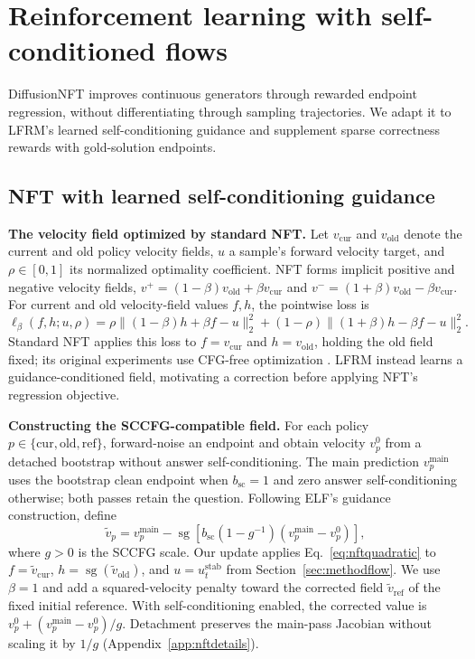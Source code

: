 \documentclass{article}
\newcommand{\sg}{\operatorname{sg}}
\newcommand{\rev}[1]{{\color{blue}#1}}
\begin{document}

\section{Reinforcement learning with self-conditioned flows}
\label{sec:nft}

DiffusionNFT \citep{diffusionnft} improves continuous generators through rewarded endpoint regression, without differentiating through sampling trajectories. We adapt it to LFRM's learned self-conditioning guidance and supplement sparse correctness rewards with gold-solution endpoints.

\subsection{NFT with learned self-conditioning guidance}
\label{sec:nftsccfg}

\textbf{The velocity field optimized by standard NFT.}
Let $v_{\mathrm{cur}}$ and $v_{\mathrm{old}}$ denote the current and old policy velocity fields, $u$ a sample's forward velocity target, and $\rho\in[0,1]$ its normalized optimality coefficient. NFT forms implicit positive and negative velocity fields, $v^+=(1-\beta)v_{\mathrm{old}}+\beta v_{\mathrm{cur}}$ and $v^-=(1+\beta)v_{\mathrm{old}}-\beta v_{\mathrm{cur}}$. For current and old velocity-field values $f,h$, the pointwise loss is
\begin{equation}
 \ell_\beta(f,h;u,\rho)
 =\rho\|(1-\beta)h+\beta f-u\|_2^2
 +(1-\rho)\|(1+\beta)h-\beta f-u\|_2^2.
\label{eq:nftquadratic}
\end{equation}
Standard NFT applies this loss to $f=v_{\mathrm{cur}}$ and $h=v_{\mathrm{old}}$, holding the old field fixed; its original experiments use CFG-free optimization \citep{diffusionnft}. LFRM instead learns a guidance-conditioned field, motivating a correction before applying NFT's regression objective.

\textbf{Constructing the SCCFG-compatible field.}
For each policy $p\in\{\mathrm{cur},\mathrm{old},\mathrm{ref}\}$, forward-noise an endpoint and obtain velocity $v_p^0$ from a detached bootstrap without answer self-conditioning. The main prediction $v_p^{\mathrm{main}}$ uses the bootstrap clean endpoint when $b_{\mathrm{sc}}=1$ and zero answer self-conditioning otherwise; both passes retain the question. Following ELF's guidance construction, define
\begin{equation}
 \widetilde v_p=v_p^{\mathrm{main}}-
 \sg\!\left[b_{\mathrm{sc}}(1-g^{-1})(v_p^{\mathrm{main}}-v_p^0)\right],
 \label{eq:nftcorrectedfield}
\end{equation}
where $g>0$ is the SCCFG scale. Our update applies Eq.~\eqref{eq:nftquadratic} to $f=\widetilde v_{\mathrm{cur}}$, $h=\sg(\widetilde v_{\mathrm{old}})$, and $u=u_t^{\mathrm{stab}}$ from Section~\ref{sec:methodflow}. We use $\beta=1$ and add a squared-velocity penalty toward the corrected field $\widetilde v_{\mathrm{ref}}$ of the fixed initial reference. With self-conditioning enabled, the corrected value is $v_p^0+(v_p^{\mathrm{main}}-v_p^0)/g$. \rev{Detachment preserves the main-pass Jacobian without scaling it by $1/g$} (Appendix~\ref{app:nftdetails}).
\end{document}

